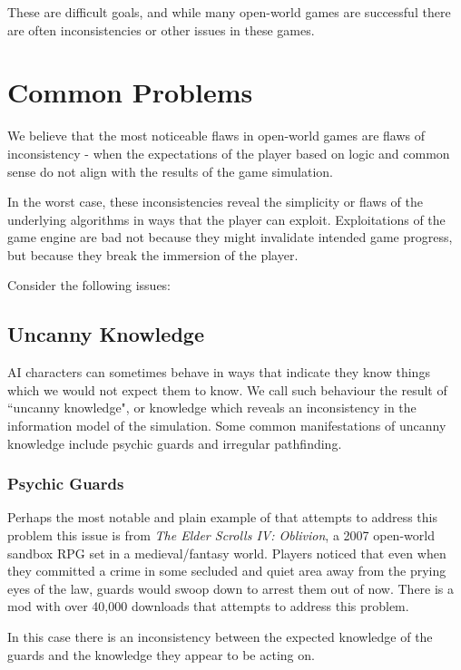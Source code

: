 These are difficult goals, and while many open-world games are successful there are often inconsistencies or other issues in these games.

\section{Common Problems}

We believe that the most noticeable flaws in open-world games are flaws of inconsistency - when the expectations of the player based on logic and common sense do not align with the results of the game simulation.

In the worst case, these inconsistencies reveal the simplicity or flaws of the underlying algorithms in ways that the player can exploit. Exploitations of the game engine are bad not because they might invalidate intended game progress, but because they break the immersion of the player.

Consider the following issues:

\subsection{Uncanny Knowledge}

AI characters can sometimes behave in ways that indicate they know things which we would not expect them to know. We call such behaviour the result of ``uncanny knowledge", or knowledge which reveals an inconsistency in the information model of the simulation. Some common manifestations of uncanny knowledge include psychic guards and irregular pathfinding.

\subsubsection{Psychic Guards}

Perhaps the most notable and plain example of that attempts to address this problem this issue is from \textit{The Elder Scrolls IV: Oblivion}, a 2007 open-world sandbox RPG set in a medieval/fantasy world. Players noticed that even when they committed a crime in some secluded and quiet area away from the prying eyes of the law, guards would swoop down to arrest them out of now. There is a mod with over 40,000 downloads that attempts to address this problem.\cite{psychic_guards}

In this case there is an inconsistency between the expected knowledge of the guards and the knowledge they appear to be acting on.

